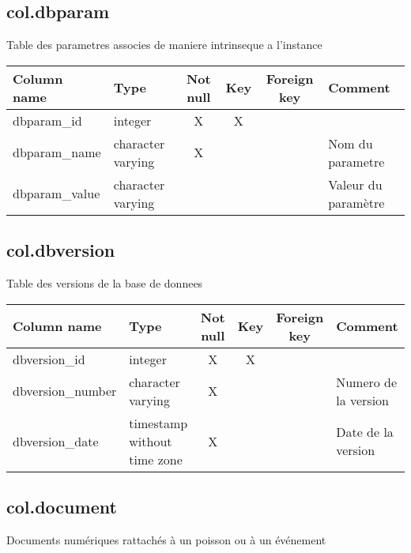 \subsection{col.dbparam}
Table des parametres associes de maniere intrinseque a l'instance

\begin{tabular}{|l| p{2cm}|c|c|c| p{3cm}|}
\hline
Column name & Type & Not null & Key & Foreign key & Comment \\
\hline
dbparam\_id & integer & X & X & & \\
\hline
dbparam\_name & character varying & X & & & Nom du parametre\\
\hline
dbparam\_value & character varying & & & & Valeur du paramètre\\
\hline
\end{tabular}
\subsection{col.dbversion}
Table des versions de la base de donnees

\begin{tabular}{|l| p{2cm}|c|c|c| p{3cm}|}
\hline
Column name & Type & Not null & Key & Foreign key & Comment \\
\hline
dbversion\_id & integer & X & X & & \\
\hline
dbversion\_number & character varying & X & & & Numero de la version\\
\hline
dbversion\_date & timestamp without time zone & X & & & Date de la version\\
\hline
\end{tabular}
\subsection{col.document}
Documents numériques rattachés à un poisson ou à un événement

